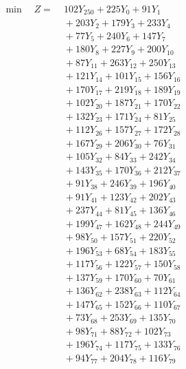 \documentclass[a4paper,10pt]{article}
\begin{document}
\allowdisplaybreaks
{\small
\begin{align}
\min \quad Z = &\; 102 Y_{250} + 225 Y_{0} + 91 Y_{1} \\[0.3ex]
&\;  + 203 Y_{2} + 179 Y_{3} + 233 Y_{4} \\[0.3ex]
&\;  + 77 Y_{5} + 240 Y_{6} + 147 Y_{7} \\[0.3ex]
&\;  + 180 Y_{8} + 227 Y_{9} + 200 Y_{10} \\[0.3ex]
&\;  + 87 Y_{11} + 263 Y_{12} + 250 Y_{13} \\[0.3ex]
&\;  + 121 Y_{14} + 101 Y_{15} + 156 Y_{16} \\[0.3ex]
&\;  + 170 Y_{17} + 219 Y_{18} + 189 Y_{19} \\[0.3ex]
&\;  + 102 Y_{20} + 187 Y_{21} + 170 Y_{22} \\[0.3ex]
&\;  + 132 Y_{23} + 171 Y_{24} + 81 Y_{25} \\[0.3ex]
&\;  + 112 Y_{26} + 157 Y_{27} + 172 Y_{28} \\[0.5ex]\allowbreak
&\;  + 167 Y_{29} + 206 Y_{30} + 76 Y_{31} \\[0.3ex]
&\;  + 105 Y_{32} + 84 Y_{33} + 242 Y_{34} \\[0.3ex]
&\;  + 143 Y_{35} + 170 Y_{36} + 212 Y_{37} \\[0.3ex]
&\;  + 91 Y_{38} + 246 Y_{39} + 196 Y_{40} \\[0.3ex]
&\;  + 91 Y_{41} + 123 Y_{42} + 202 Y_{43} \\[0.3ex]
&\;  + 237 Y_{44} + 81 Y_{45} + 136 Y_{46} \\[0.3ex]
&\;  + 199 Y_{47} + 162 Y_{48} + 244 Y_{49} \\[0.3ex]
&\;  + 98 Y_{50} + 157 Y_{51} + 220 Y_{52} \\[0.3ex]
&\;  + 196 Y_{53} + 68 Y_{54} + 183 Y_{55} \\[0.3ex]
&\;  + 117 Y_{56} + 122 Y_{57} + 150 Y_{58} \\[0.5ex]\allowbreak
&\;  + 137 Y_{59} + 170 Y_{60} + 70 Y_{61} \\[0.3ex]
&\;  + 136 Y_{62} + 238 Y_{63} + 112 Y_{64} \\[0.3ex]
&\;  + 147 Y_{65} + 152 Y_{66} + 110 Y_{67} \\[0.3ex]
&\;  + 73 Y_{68} + 253 Y_{69} + 135 Y_{70} \\[0.3ex]
&\;  + 98 Y_{71} + 88 Y_{72} + 102 Y_{73} \\[0.3ex]
&\;  + 196 Y_{74} + 117 Y_{75} + 133 Y_{76} \\[0.3ex]
&\;  + 94 Y_{77} + 204 Y_{78} + 116 Y_{79} \\[0.3ex]

\end{align}}
\end{document}
